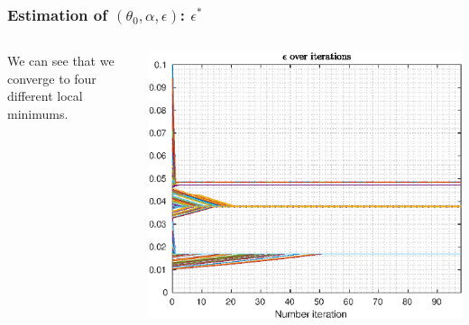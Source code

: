 \documentclass[aspectratio=169]{beamer}\usepackage[utf8]{inputenc}
\begin{document}
\begin{frame}\frametitle{Estimation of $(\theta_0,\alpha,\epsilon)$: $\epsilon^*$}

\begin{columns}

We can see that we converge to four different local minimums.

\includegraphics[width=1\textwidth]{../../MATLAB_Files/Results/epsilon/epsilon.eps}
\end{columns}

\end{frame}
\end{document}

